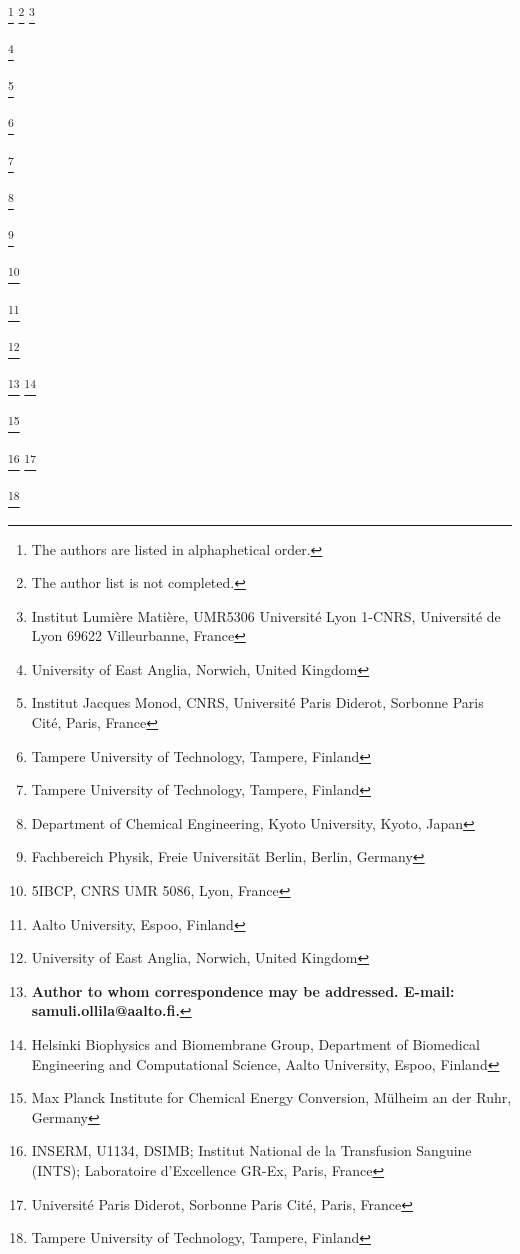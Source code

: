 \documentclass[pre,aps,floatfix,authordate1-4,twocolumn]{revtex4-1}
\begin{document}
\author{Alexandru Botan}
\thanks{The authors are listed in alphaphetical order.}
\thanks{The author list is not completed.}
\thanks{Institut Lumi\`ere Mati\`ere, UMR5306 Universit\'e Lyon 1-CNRS, Universit\'e de Lyon 69622 Villeurbanne, France}
%
\author{Andrea Catte}
\thanks{University of East Anglia, Norwich, United Kingdom}
\author{Fernando Favela}
\author{Patrick Fuchs}
\thanks{Institut Jacques Monod, CNRS, Universit\'e Paris Diderot, Sorbonne Paris Cit\'e, Paris, France}
\author{Matti Javanainen}
\thanks{Tampere University of Technology, Tampere, Finland}
\author{Waldemar Kulig}
\thanks{Tampere University of Technology, Tampere, Finland}
\author{Antti Lamberg}
\thanks{Department of Chemical Engineering, Kyoto University, Kyoto, Japan}
\author{Markus S. Miettinen}
\thanks{Fachbereich Physik, Freie Universit\"at Berlin, Berlin, Germany}
\author{Luca Monticelli}
\thanks{5IBCP, CNRS UMR 5086, Lyon, France}
\author{Jukka M\"a\"att\"a}
\thanks{Aalto University, Espoo, Finland}
\author{Vasily S. Oganesyan}
\thanks{University of East Anglia, Norwich, United Kingdom}
\author{O. H. Samuli Ollila} 
\thanks{{\bf Author to whom correspondence may be addressed. E-mail: samuli.ollila@aalto.fi.}}
\thanks{Helsinki Biophysics and Biomembrane Group, Department of Biomedical Engineering and Computational Science, Aalto University, Espoo, Finland}
\author{Marius Retegan}
\thanks{Max Planck Institute for Chemical Energy Conversion, M\"ulheim an der Ruhr, Germany}
\author{Hubert Santuz}
\thanks{INSERM, U1134, DSIMB; Institut National de la Transfusion Sanguine (INTS); Laboratoire d'Excellence GR-Ex, Paris, France}
\thanks{Universit\'e Paris Diderot, Sorbonne Paris Cit\'e, Paris, France}
\author{Joona Tynkkynen}
\thanks{Tampere University of Technology, Tampere, Finland}
\end{document}
